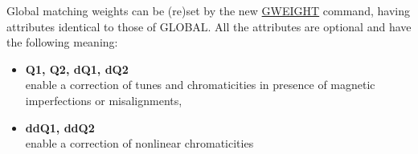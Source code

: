 Global matching weights can be (re)set by the new 
\href{gweight}{GWEIGHT} command, having attributes identical to those of
GLOBAL. 
All the attributes are optional and have the following meaning:
\begin{itemize}
  \item {\bf Q1, Q2, dQ1, dQ2} \\
    enable a correction of tunes and chromaticities in presence of
    magnetic imperfections or misalignments, 
  \item {\bf ddQ1, ddQ2} \\
    enable a correction of nonlinear chromaticities
\end{itemize}
